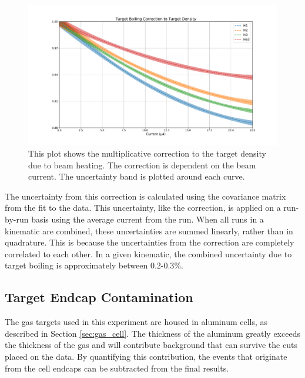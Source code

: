 \begin{figure}
	\includegraphics[width=\textwidth]{./analysis/fig/boil_cor.pdf}
	\caption{This plot shows the multiplicative correction to the target density due to beam heating. The correction is dependent on the beam current. The uncertainty band is plotted around each curve.}
	\label{fig:boilcor}
\end{figure}


The uncertainty from this correction is calculated using the covariance matrix from the fit to the data. This uncertainty, like the correction, is applied on a run-by-run basis using the average current from the run. When all runs in a kinematic are combined, these uncertainties are summed linearly, rather than in quadrature. This is because the uncertainties from the correction are completely correlated to each other. In a given kinematic, the combined uncertainty due to target boiling is approximately between $0.2$-$0.3\%$.

\subsection{Target Endcap Contamination}
\label{sec:ecc}

The gas targets used in this experiment are housed in aluminum cells, as described in Section \ref{sec:gas_cell}. The thickness of the aluminum greatly exceeds the thickness of the gas and will contribute background that can survive the cuts placed on the data. By quantifying this contribution, the events that originate from the cell endcaps can be subtracted from the final results.

